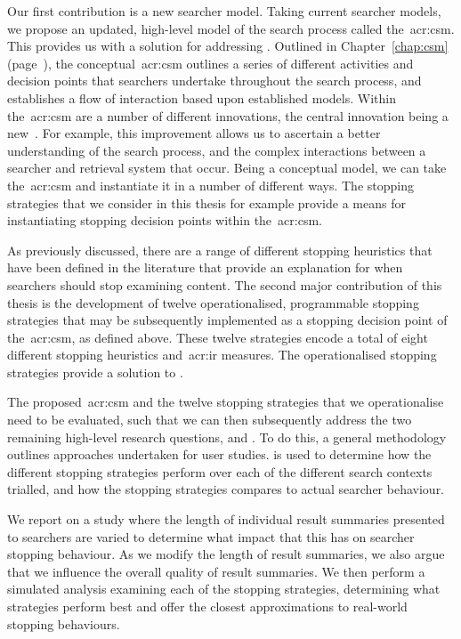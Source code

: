 \noindent
{} Our first contribution is a new searcher model. Taking current searcher models, we propose an updated, high-level model of the search process called the~\gls{acr:csm}. This provides us with a solution for addressing . Outlined in Chapter~\ref{chap:csm} (page~\pageref{chap:csm}), the conceptual~\gls{acr:csm} outlines a series of different activities and decision points that searchers undertake throughout the search process, and establishes a flow of interaction based upon established models. Within the~\gls{acr:csm} are a number of different innovations, the central innovation being a new~. For example, this improvement allows us to ascertain a better understanding of the search process, and the complex interactions between a searcher and retrieval system that occur. Being a conceptual model, we can take the~\gls{acr:csm} and instantiate it in a number of different ways. The stopping strategies that we consider in this thesis for example provide a means for instantiating stopping decision points within the~\gls{acr:csm}.

\noindent
{} As previously discussed, there are a range of different stopping heuristics that have been defined in the literature that provide an explanation for when searchers should stop examining content. The second major contribution of this thesis is the development of twelve operationalised, programmable stopping strategies that may be subsequently implemented as a stopping decision point of the~\gls{acr:csm}, as defined above. These twelve strategies encode a total of eight different stopping heuristics and~\gls{acr:ir} measures. The operationalised stopping strategies provide a solution to .

\noindent
{} The proposed~\gls{acr:csm} and the twelve stopping strategies that we operationalise need to be evaluated, such that we can then subsequently address the two remaining high-level research questions,  and . To do this, a general methodology outlines approaches undertaken for user studies.  is used to determine how the different stopping strategies perform over each of the different search contexts trialled, and how the stopping strategies compares to actual searcher behaviour.

\noindent
{} We report on a study where the length of individual result summaries presented to searchers are varied to determine what impact that this has on searcher stopping behaviour. As we modify the length of result summaries, we also argue that we influence the overall quality of result summaries. We then perform a simulated analysis examining each of the stopping strategies, determining what strategies perform best and offer the closest approximations to real-world stopping behaviours.

